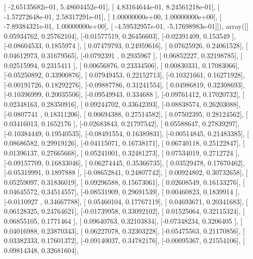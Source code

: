 \documentclass{article}
\begin{document}
       [ -2.65135682e-01,   5.48604452e-01],
       [  4.83164644e-01,   8.24561218e-01],
       [ -1.57272648e-01,   2.58317291e-01],
       [  1.00000000e+00,   1.00000000e+00],
       [ -7.89384321e-01,   1.00000000e+00],
       [ -4.59532957e-01,  -5.17698983e-01]]), array([[ 0.05934762,  0.25762104],
       [-0.01577519,  0.26456603],
       [-0.02391409,  0.153549  ],
       [-0.08604533,  0.1855974 ],
       [ 0.07479793,  0.24959616],
       [ 0.07625926,  0.24061528],
       [ 0.04612973,  0.31679565],
       [-0.0792391 ,  0.2935967 ],
       [ 0.06852227,  0.32198785],
       [ 0.02515994,  0.2315411 ],
       [ 0.00656876,  0.23334506],
       [ 0.00830331,  0.17083066],
       [-0.05250892,  0.33900876],
       [ 0.07949453,  0.22152713],
       [-0.10321661,  0.16271928],
       [-0.00191726,  0.18292276],
       [-0.09887786,  0.31241554],
       [ 0.04986819,  0.32308693],
       [-0.10396999,  0.20035506],
       [-0.09549943,  0.334688  ],
       [-0.09761412,  0.17020732],
       [ 0.02348163,  0.28350916],
       [ 0.09244702,  0.33642393],
       [-0.08838574,  0.26203088],
       [-0.0807741 ,  0.18311206],
       [ 0.00694388,  0.27514582],
       [ 0.07502395,  0.28124562],
       [ 0.03416013,  0.1652176 ],
       [-0.02683843,  0.21797542],
       [ 0.05588647,  0.27839297],
       [-0.10384449,  0.19540535],
       [-0.08491554,  0.16389831],
       [-0.00514845,  0.21483385],
       [ 0.08686582,  0.29919126],
       [-0.04115071,  0.16738171],
       [ 0.06740118,  0.25122847],
       [ 0.01396137,  0.27665668],
       [ 0.05241001,  0.32481273],
       [ 0.07534019,  0.2712724 ],
       [-0.09157709,  0.16833046],
       [ 0.06274445,  0.35366735],
       [ 0.03529478,  0.17670462],
       [-0.05319991,  0.1897888 ],
       [-0.08652841,  0.24807742],
       [ 0.00924802,  0.30732658],
       [ 0.05259097,  0.31836019],
       [ 0.09296588,  0.15673061],
       [ 0.02608549,  0.16133276],
       [ 0.04645572,  0.34514557],
       [-0.08531909,  0.29691539],
       [ 0.00460823,  0.1839914 ],
       [-0.0110927 ,  0.34667788],
       [ 0.05460104,  0.17767119],
       [ 0.04693671,  0.20341683],
       [ 0.06128325,  0.24764621],
       [-0.01739958,  0.33092102],
       [ 0.01525064,  0.32115324],
       [ 0.06855105,  0.1771464 ],
       [ 0.09640763,  0.32103834],
       [-0.07348234,  0.3206405 ],
       [ 0.04016988,  0.23870343],
       [ 0.06227078,  0.32303228],
       [-0.05475563,  0.21170856],
       [ 0.03382333,  0.17601372],
       [-0.09140037,  0.34782176],
       [-0.00095367,  0.21554106],
       [ 0.09814348,  0.32681604],
\end{document}
